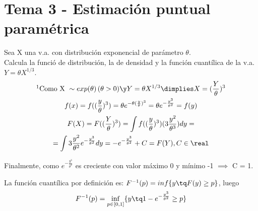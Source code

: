 \newpage
\section{Tema 3 - Estimación puntual paramétrica}

\begin{problem}[1]
Sea X una v.a. con distribución exponencial de parámetro $\theta$.\\
Calcula la funció de distribución, la de densidad y la función cuantílica de la v.a. $ Y = \theta X^{1/3} $.
\solution
\begin{gather*}
\footnotemark\text{Como X }\sim exp(\theta) \,(\theta > 0) \y Y = \theta X^{1/3} \dimplies X = (\frac{Y}{\theta})^{3}\\
f(x) = f((\frac{y}{\theta})^3) =
\theta e^{-\theta (\frac{y}{\theta})^3} =
\theta e^{-\frac{y^3}{\theta^2}} =
f(y) \\
F(X) = F((\frac{Y}{\theta})^{3}) =
\int f((\frac{y}{\theta})^{3}) (3\frac{y^2}{\theta^3}) dy =\\
= \int 3\frac{y^2}{\theta^2} e^{-\frac{y^3}{\theta^2}} dy =
- e^{-\frac{y^3}{\theta^2}} + C = F(Y),  C \in \real
\end{gather*}

Finalmente, como $ e^{-\frac{y^3}{\theta^2}} $ es creciente con valor máximo 0 y mínimo -1 $ \implies $ C = 1.

La función cuantílica por definición es: $ F^{-1}(p) = inf\{y \tq F(y) \geq p\} $, luego
\[
F^{-1}(p) = \inf_{p \in [0,1]}\{ y \tq 1 - e^{-\frac{y^3}{\theta^2}} \geq p \}
\]

\end{problem}

